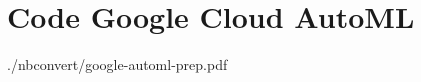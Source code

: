 
\chapter{Code Google Cloud AutoML}
\label{ch:app:google-automl}


{./nbconvert/google-automl-prep.pdf}